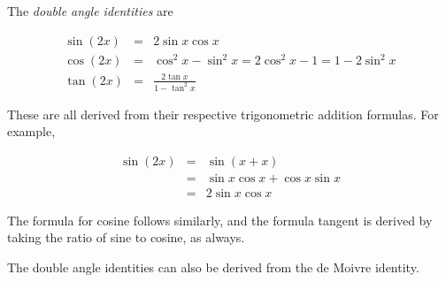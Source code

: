 \documentclass{article}
\begin{document}

The \emph{double angle identities} are

\begin{eqnarray}
 \sin(2x) & = & 2\sin{x}\cos{x} \\
 \cos(2x) & = & \cos^2{x}-\sin^2{x} = 2\cos^2{x}-1 = 1-2\sin^2{x} \\
 \tan(2x) & = & \frac{2\tan{x}}{1-\tan^2{x}}
\end{eqnarray}

These are all derived from their respective trigonometric addition formulas.  For example,

\begin{eqnarray*}
 \sin(2x) & = & \sin(x+x) \\
          & = & \sin{x}\cos{x}+\cos{x}\sin{x} \\
          & = & 2\sin{x}\cos{x} 
\end{eqnarray*}

The formula for cosine follows similarly, and the formula tangent is derived by taking the ratio of sine to cosine, as always.

The double angle identities can also be derived from the de Moivre identity.
\end{document}
